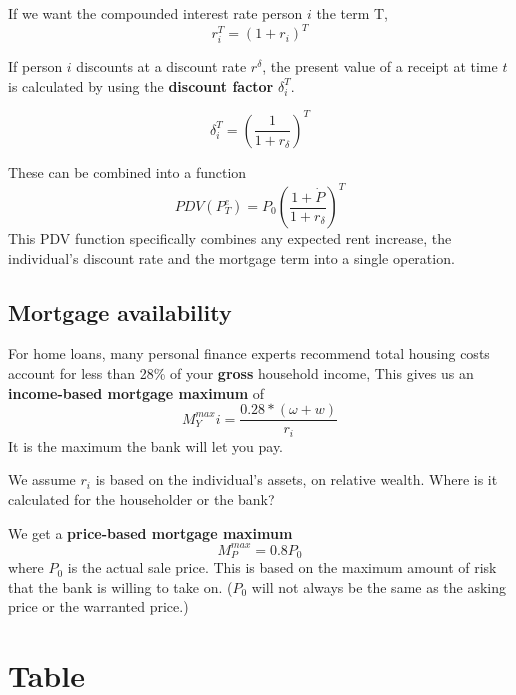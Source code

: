 If we want the compounded interest rate person $i$ the term T,
\[r_i^T=(1+r_i)^T\]

If person $i$  discounts at a discount rate $r^\delta$, the present value of a receipt at time $t$ is calculated by using the \textbf{discount factor} $\delta_i^T$.

\[\delta_i^T= \left( \frac{1}{1+r_\delta} \right)^T \]
 
These can be combined into a function %
\[ PDV(P^e_T)=P_0\left( \frac{1+\dot P}{1+r_\delta} \right)^T \]
This PDV function specifically combines any expected rent increase, the individual's discount rate and the mortgage term into a single operation.

\subsection{Mortgage availability}
For home loans, many personal finance experts recommend total housing costs account for less than 28\% of your \textbf{gross} household income, This gives us an \textbf{income-based  mortgage maximum} of \[M^{max}_Yi = \frac{0.28*(\omega+w)}{r_i}\] It is the maximum the bank will let you pay.

We assume $r_i$ is based on the individual's assets, on relative wealth. Where is it calculated for the householder or the bank?

We get a \textbf{price-based mortgage maximum} \[M^{max}_P = 0.8P_0\] where $P_0$ is the actual sale price. This is based on the maximum amount of risk that the bank is willing to take on. ($P_0$  will not always be the same as the asking price or the warranted price.)


\section{Table}

